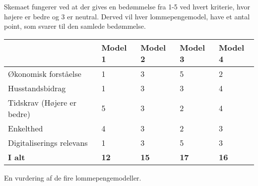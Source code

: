 \noindent Skemaet fungerer ved at der gives en bedømmelse fra 1-5 ved hvert kriterie, hvor højere er bedre og 3 er neutral. Derved vil hver lommepengemodel, have et antal point, som svarer til den samlede bedømmelse.\\

\begin{center}
   \begin{tabular}{| l | l | l | l | l |} 
   \hline
   & \textbf{Model 1} & \textbf{Model 2} & \textbf{Model 3} & \textbf{Model 4} \\ \hline
   Økonomisk forståelse & 1 & 3 & 5 & 2 \\ \hline
   Husstandsbidrag & 1 & 3 & 3 & 4 \\ \hline
   Tidskrav (Højere er bedre) & 5 & 3 & 2 & 4 \\ \hline
   Enkelthed & 4 & 3 & 2 & 3 \\ \hline
   Digitaliserings relevans & 1 & 3 & 5 & 3 \\ \hline
   \textbf{I alt} & \textbf{12} & \textbf{15} & \textbf{17} & \textbf{16} \\ \hline
   \end{tabular}
   \caption{En vurdering af de fire lommepengemodeller.}
\end{center}   

